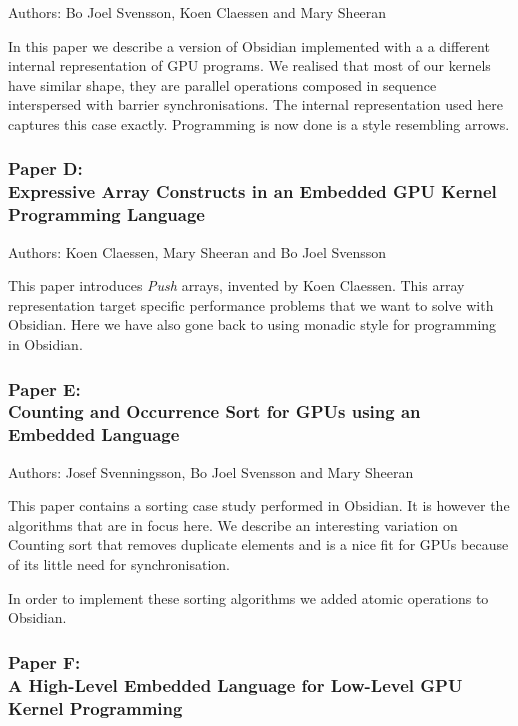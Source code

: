 \documentclass[a4paper]{book}
\newcommand{\paperD}{Paper D}
\newcommand{\paperDTitle}{Expressive Array Constructs in an Embedded GPU Kernel Programming Language}
\newcommand{\paperE}{Paper E}
\newcommand{\paperETitle}{Counting and Occurrence Sort for GPUs using an Embedded Language}
\newcommand{\paperF}{Paper F}
\newcommand{\paperFTitle}{A High-Level Embedded Language for Low-Level GPU Kernel Programming}
\begin{document}
Authors: Bo Joel Svensson, Koen Claessen and Mary Sheeran \newline

\vspace{5mm}

In this paper we describe a version of Obsidian implemented with a 
a different internal representation of GPU programs. We realised that 
most of our kernels have similar shape, they are parallel operations 
composed in sequence interspersed with barrier synchronisations. The 
internal representation used here captures this case exactly. Programming 
is now done is a style resembling arrows. 


\subsubsection{\paperD: \\ \paperDTitle}

Authors: Koen Claessen, Mary Sheeran and  Bo Joel Svensson \newline

\vspace{5mm}

This paper introduces {\em Push} arrays, invented by Koen Claessen. This 
array representation target specific performance problems that we want 
to solve with Obsidian. Here we have also gone back to using monadic 
style for programming in Obsidian. 


\subsubsection{\paperE: \\ \paperETitle} 

Authors: Josef Svenningsson, Bo Joel Svensson and Mary Sheeran \newline

\vspace{5mm}

This paper contains a sorting case study performed in Obsidian. It 
is however the algorithms that are in focus here. We describe 
an interesting variation on Counting sort that removes duplicate 
elements and is a nice fit for GPUs because of its little need for 
synchronisation. 

In order to implement these sorting algorithms we added atomic operations 
to Obsidian. 

\subsubsection{\paperF: \\ \paperFTitle}
\end{document}
